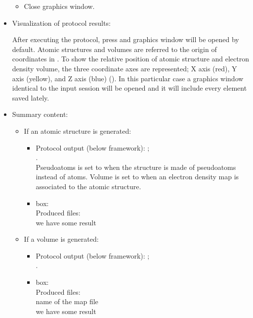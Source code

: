 \begin{itemize}
\begin{itemize}
   \item Close \chimera graphics window.

 \end{itemize}
  \item Visualization of protocol results:
  
    After executing the protocol, press  and \chimera graphics window will be opened by default. Atomic structures and volumes are referred to the origin of coordinates in \chimera. To show the relative position of atomic structure and electron density volume, the three coordinate axes are represented; X axis (red), Y axis (yellow), and Z axis (blue) (). In this particular case a \chimera graphics window identical to the input session will be opened and it will include every element saved lately. 
   
  \item Summary content:
  
   \begin{itemize}
    \item If an atomic structure is generated:

    \begin{itemize}
     \item Protocol output (below \scipion framework):
      ;\\ .\\Pseudoatoms is set to  when the structure is made of pseudoatoms instead of atoms. Volume is set to  when an electron density map is associated to the atomic structure.\\
     \item {} box:\\Produced files:\\we have some result
    \end{itemize}
    \item If a volume is generated:
    
    \begin{itemize}
     \item Protocol output (below \scipion framework):
      ;\\ .\\
     \item {} box:\\Produced files:\\name of the map file\\we have some result
    \end{itemize}
    
   \end{itemize}
  
 \end{itemize}
